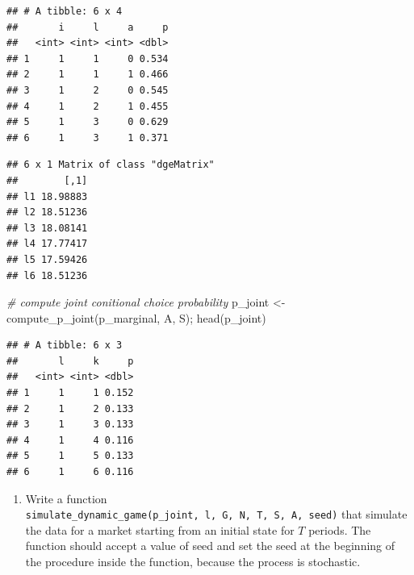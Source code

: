 \documentclass[
]{book}
\newenvironment{Shaded}{\begin{snugshade}}{\end{snugshade}}
\newcommand{\AttributeTok}[1]{\textcolor[rgb]{0.77,0.63,0.00}{#1}}
\newcommand{\CommentTok}[1]{\textcolor[rgb]{0.56,0.35,0.01}{\textit{#1}}}
\newcommand{\FunctionTok}[1]{\textcolor[rgb]{0.00,0.00,0.00}{#1}}
\newcommand{\NormalTok}[1]{#1}
\newcommand{\OtherTok}[1]{\textcolor[rgb]{0.56,0.35,0.01}{#1}}
\newcommand{\SpecialCharTok}[1]{\textcolor[rgb]{0.00,0.00,0.00}{#1}}
\newcommand{\StringTok}[1]{\textcolor[rgb]{0.31,0.60,0.02}{#1}}
\providecommand{\tightlist}{%
  \setlength{\itemsep}{0pt}\setlength{\parskip}{0pt}}
\begin{document}
\begin{Shaded}
\end{Shaded}

\begin{verbatim}
## # A tibble: 6 x 4
##       i     l     a     p
##   <int> <int> <int> <dbl>
## 1     1     1     0 0.534
## 2     1     1     1 0.466
## 3     1     2     0 0.545
## 4     1     2     1 0.455
## 5     1     3     0 0.629
## 6     1     3     1 0.371
\end{verbatim}

\begin{Shaded}
\end{Shaded}

\begin{verbatim}
## 6 x 1 Matrix of class "dgeMatrix"
##        [,1]
## l1 18.98883
## l2 18.51236
## l3 18.08141
## l4 17.77417
## l5 17.59426
## l6 18.51236
\end{verbatim}

\begin{Shaded}
\begin{Highlighting}[]
\CommentTok{\# compute joint conitional choice probability}
\NormalTok{p\_joint }\OtherTok{\textless{}{-}} \FunctionTok{compute\_p\_joint}\NormalTok{(p\_marginal, A, S); }\FunctionTok{head}\NormalTok{(p\_joint)}
\end{Highlighting}
\end{Shaded}

\begin{verbatim}
## # A tibble: 6 x 3
##       l     k     p
##   <int> <int> <dbl>
## 1     1     1 0.152
## 2     1     2 0.133
## 3     1     3 0.133
## 4     1     4 0.116
## 5     1     5 0.133
## 6     1     6 0.116
\end{verbatim}

\begin{enumerate}
\def\labelenumi{\arabic{enumi}.}
\setcounter{enumi}{11}
\tightlist
\item
  Write a function \texttt{simulate\_dynamic\_game(p\_joint,\ l,\ G,\ N,\ T,\ S,\ A,\ seed)} that simulate the data for a market starting from an initial state for \(T\) periods. The function should accept a value of seed and set the seed at the beginning of the procedure inside the function, because the process is stochastic.
\end{enumerate}
\end{document}
